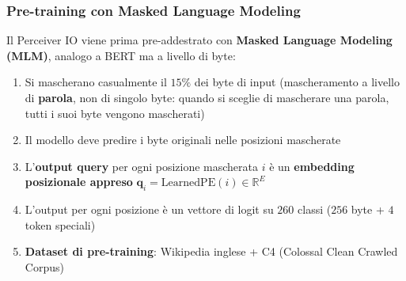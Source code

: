 \documentclass[12pt,a4paper]{article}
\begin{document}
\subsubsection{Pre-training con Masked Language Modeling}

Il Perceiver IO viene prima pre-addestrato con \textbf{Masked Language Modeling (MLM)}, analogo a BERT ma a livello di byte:
\begin{enumerate}
    \item Si mascherano casualmente il $15\%$ dei byte di input (mascheramento a livello di \textbf{parola}, non di singolo byte: quando si sceglie di mascherare una parola, tutti i suoi byte vengono mascherati)
    \item Il modello deve predire i byte originali nelle posizioni mascherate
    \item L'\textbf{output query} per ogni posizione mascherata $i$ \`e un \textbf{embedding posizionale appreso} $\mathbf{q}_i = \text{LearnedPE}(i) \in \mathbb{R}^E$
    \item L'output per ogni posizione \`e un vettore di logit su $260$ classi ($256$ byte + $4$ token speciali)
    \item \textbf{Dataset di pre-training}: Wikipedia inglese + C4 (Colossal Clean Crawled Corpus)
\end{enumerate}
\end{document}
